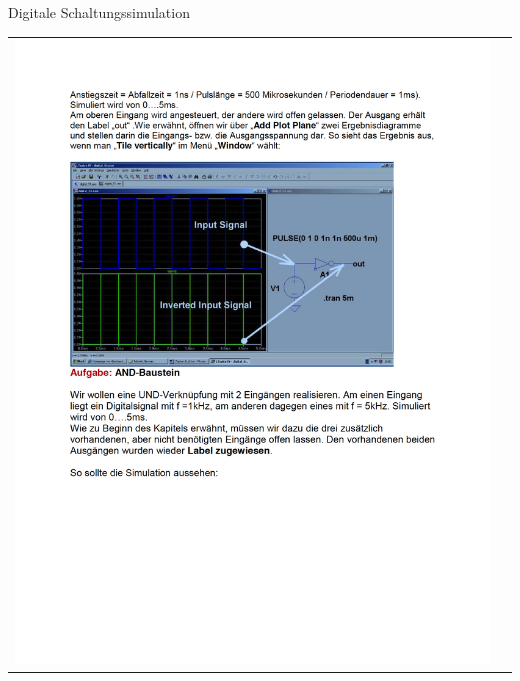 \begin{frame}[t]{Digitale Schaltungssimulation}
\begin{spacing}{0.9}
\begin{tiny}
\begin{table}[h!]
\begin{tabular}{p{5cm} p{5cm}}
\begin{minipage}{0.5\textwidth}
                \includegraphics[width=\linewidth]{pictures/legacy/digi_2.png}
            \end{minipage} 
      \end{tabular}
    \end{table}
    \end{tiny} \end{spacing}
\end{frame}

